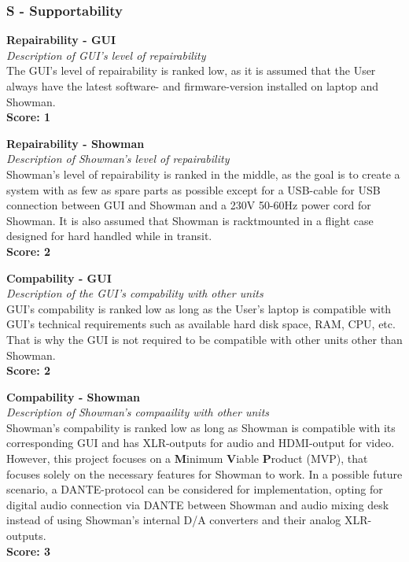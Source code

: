 \subsubsection{\textbf{S} - Supportability}
\textbf{Repairability - GUI} \\
\textit{Description of GUI's level of repairability} \\
The GUI's level of repairability is ranked low, as it is assumed that the User always have the latest software- and firmware-version installed on laptop and Showman. \\
\textbf{Score: 1} \newline

\textbf{Repairability - Showman} \\
\textit{Description of Showman's level of repairability} \\
Showman's level of repairability is ranked in the middle, as the goal is to create a system with as few as spare parts as possible except for a USB-cable for USB connection between GUI and Showman and a 230V 50-60Hz power cord for Showman. It is also assumed that Showman is racktmounted in a flight case designed for hard handled while in transit. \\
\textbf{Score: 2} \newline

\textbf{Compability - GUI} \\
\textit{Description of the GUI's compability with other units} \\
GUI's compability is ranked low as long as the User's laptop is compatible with GUI's technical requirements such as available hard disk space, RAM, CPU, etc. That is why the GUI is not required to be compatible with other units other than Showman. \\
\textbf{Score: 2} \newline

\textbf{Compability - Showman} \\
\textit{Description of Showman's compaaility with other units} \\
Showman's compability is ranked low as long as Showman is compatible with its corresponding GUI and has XLR-outputs for audio and HDMI-output for video. However, this project focuses on a \textbf{M}inimum \textbf{V}iable \textbf{P}roduct (MVP), that focuses solely on the necessary features for Showman to work. In a possible future scenario, a DANTE-protocol can be considered for implementation, opting for digital audio connection via DANTE between Showman and audio mixing desk instead of using Showman's internal D/A converters and their analog XLR-outputs. \\
\textbf{Score: 3} \newline

